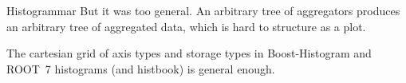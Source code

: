 \documentclass[aspectratio=169]{beamer}
\begin{document}
\begin{frame}{Histogrammar}
\large
\vspace{0.5 cm}
But it was too general. An arbitrary tree of aggregators produces an arbitrary tree of aggregated data, which is hard to structure as a plot.

\vspace{1 cm}
The cartesian grid of axis types and storage types in Boost-Histogram and ROOT~7 histograms (and histbook) is general enough.
\end{frame}
\end{document}
